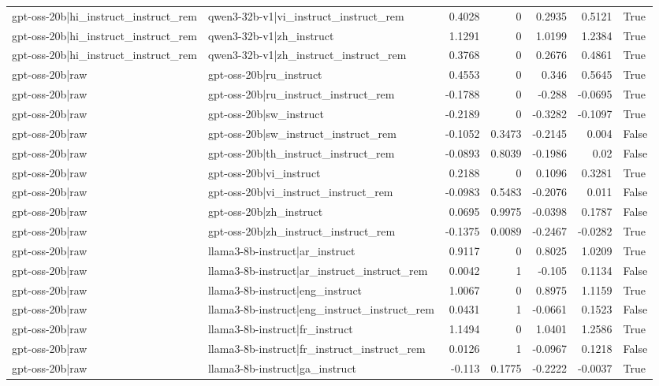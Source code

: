 \begin{table}
\begin{tabular}{l l r r r r l}
gpt-oss-20b|hi_instruct_instruct_rem & qwen3-32b-v1|vi_instruct_instruct_rem & 0.4028 & 0 & 0.2935 & 0.5121 & True \\
gpt-oss-20b|hi_instruct_instruct_rem & qwen3-32b-v1|zh_instruct & 1.1291 & 0 & 1.0199 & 1.2384 & True \\
gpt-oss-20b|hi_instruct_instruct_rem & qwen3-32b-v1|zh_instruct_instruct_rem & 0.3768 & 0 & 0.2676 & 0.4861 & True \\
gpt-oss-20b|raw & gpt-oss-20b|ru_instruct & 0.4553 & 0 & 0.346 & 0.5645 & True \\
gpt-oss-20b|raw & gpt-oss-20b|ru_instruct_instruct_rem & -0.1788 & 0 & -0.288 & -0.0695 & True \\
gpt-oss-20b|raw & gpt-oss-20b|sw_instruct & -0.2189 & 0 & -0.3282 & -0.1097 & True \\
gpt-oss-20b|raw & gpt-oss-20b|sw_instruct_instruct_rem & -0.1052 & 0.3473 & -0.2145 & 0.004 & False \\
gpt-oss-20b|raw & gpt-oss-20b|th_instruct_instruct_rem & -0.0893 & 0.8039 & -0.1986 & 0.02 & False \\
gpt-oss-20b|raw & gpt-oss-20b|vi_instruct & 0.2188 & 0 & 0.1096 & 0.3281 & True \\
gpt-oss-20b|raw & gpt-oss-20b|vi_instruct_instruct_rem & -0.0983 & 0.5483 & -0.2076 & 0.011 & False \\
gpt-oss-20b|raw & gpt-oss-20b|zh_instruct & 0.0695 & 0.9975 & -0.0398 & 0.1787 & False \\
gpt-oss-20b|raw & gpt-oss-20b|zh_instruct_instruct_rem & -0.1375 & 0.0089 & -0.2467 & -0.0282 & True \\
gpt-oss-20b|raw & llama3-8b-instruct|ar_instruct & 0.9117 & 0 & 0.8025 & 1.0209 & True \\
gpt-oss-20b|raw & llama3-8b-instruct|ar_instruct_instruct_rem & 0.0042 & 1 & -0.105 & 0.1134 & False \\
gpt-oss-20b|raw & llama3-8b-instruct|eng_instruct & 1.0067 & 0 & 0.8975 & 1.1159 & True \\
gpt-oss-20b|raw & llama3-8b-instruct|eng_instruct_instruct_rem & 0.0431 & 1 & -0.0661 & 0.1523 & False \\
gpt-oss-20b|raw & llama3-8b-instruct|fr_instruct & 1.1494 & 0 & 1.0401 & 1.2586 & True \\
gpt-oss-20b|raw & llama3-8b-instruct|fr_instruct_instruct_rem & 0.0126 & 1 & -0.0967 & 0.1218 & False \\
gpt-oss-20b|raw & llama3-8b-instruct|ga_instruct & -0.113 & 0.1775 & -0.2222 & -0.0037 & True \\

\end{tabular}
\end{table}
